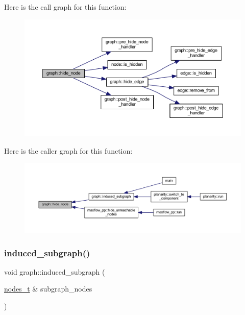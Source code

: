 Here is the call graph for this function\+:
\nopagebreak
\begin{figure}[H]
\begin{center}
\leavevmode
\includegraphics[width=350pt]{classgraph_a214618b5e3c02695779350532506e225_cgraph}
\end{center}
\end{figure}
Here is the caller graph for this function\+:
\nopagebreak
\begin{figure}[H]
\begin{center}
\leavevmode
\includegraphics[width=350pt]{classgraph_a214618b5e3c02695779350532506e225_icgraph}
\end{center}
\end{figure}
\mbox{\label{classgraph_a15b766094bb0b97ef53e06e7c26b2197}} 
\subsubsection{\texorpdfstring{induced\+\_\+subgraph()}{induced\_subgraph()}}
{\footnotesize\ttfamily void graph\+::induced\+\_\+subgraph (\begin{DoxyParamCaption}\item[{\mbox{\hyperlink{edge_8h_a22ac17689106ba21a84e7bc54d1199d6}{nodes\+\_\+t}} \&}]{subgraph\+\_\+nodes }\end{DoxyParamCaption})\hspace{0.3cm}{\ttfamily [inherited]}}

